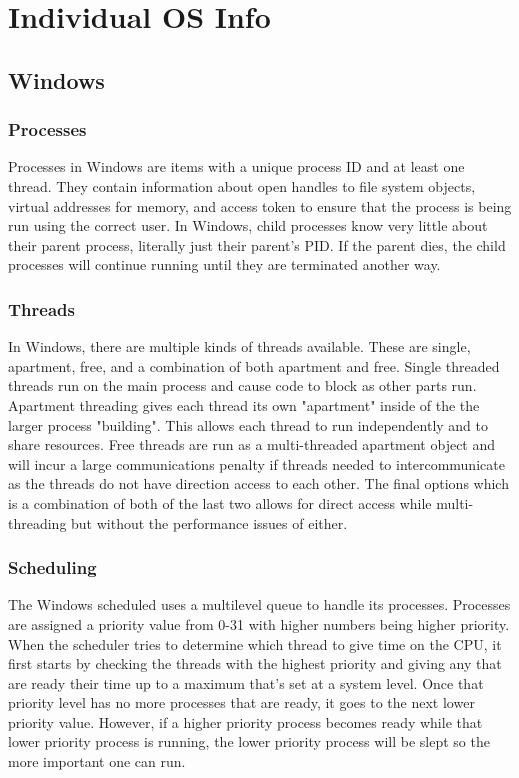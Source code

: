 \section{Individual OS Info}
\subsection{Windows}
\subsubsection{Processes}
Processes in Windows are items with a unique process ID and at least one thread. They contain information about open handles to file system objects, virtual addresses for memory, and access token to ensure that the process is being run using the correct user. In Windows, child processes know very little about their parent process, literally just their parent's PID. If the parent dies, the child processes will continue running until they are terminated another way. 
\subsubsection{Threads}
In Windows, there are multiple kinds of threads available. These are single, apartment, free, and a combination of both apartment and free. Single threaded threads run on the main process and cause code to block as other parts run. Apartment threading gives each thread its own "apartment" inside of the the larger process "building". This allows each thread to run independently and to share resources. Free threads are run as a multi-threaded apartment object and will incur a large communications penalty if threads needed to intercommunicate as the threads do not have direction access to each other. The final options which is a combination of both of the last two allows for direct access while multi-threading but without the performance issues of either.
\subsubsection{Scheduling}
The Windows scheduled uses a multilevel queue to handle its processes. Processes are assigned a priority value from 0-31 with higher numbers being higher priority. When the scheduler tries to determine which thread to give time on the CPU, it first starts by checking the threads with the highest priority and giving any that are ready their time up to a maximum that's set at a system level. Once that priority level has no more processes that are ready, it goes to the next lower priority value. However, if a higher priority process becomes ready while that lower priority process is running, the lower priority process will be slept so the more important one can run. 

